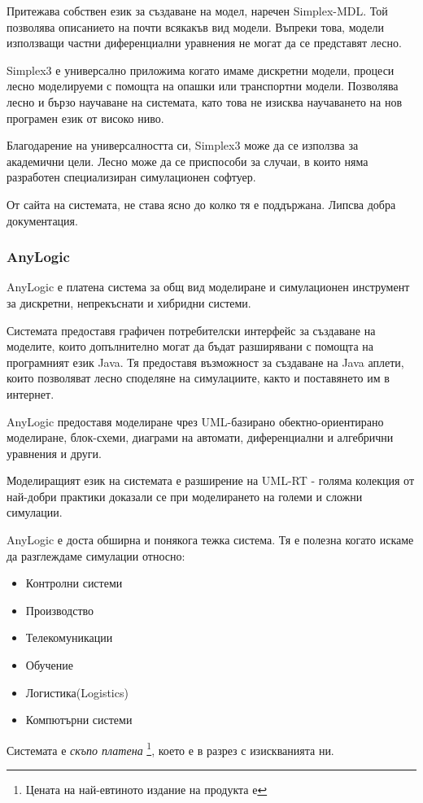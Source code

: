 			Притежава собствен език за създаване на модел, наречен Simplex-MDL. 
			Той позволява описанието на почти всякакъв вид модели. Въпреки това,
			модели използващи частни диференциални уравнения не могат да се представят
			лесно.
			
			Simplex3 е универсално приложима когато имаме дискретни модели, процеси
			лесно моделируеми с помощта на опашки или транспортни модели. 
			Позволява лесно и бързо научаване на системата, като това не изисква
			научаването на нов програмен език от високо ниво.
			
			Благодарение на универсалността си, Simplex3 може да се използва за академични цели.
			Лесно може да се приспособи за случаи, в които няма разработен специализиран симулационен
			софтуер. 
			
			От сайта на системата, не става ясно до колко тя е поддържана. 
			Липсва добра документация.\cite{Simplex3}
		
		\subsubsection{AnyLogic}
			AnyLogic е платена система за общ вид моделиране и симулационен инструмент за 
			дискретни, непрекъснати и хибридни системи.
			
			Системата предоставя графичен потребителски интерфейс за създаване на моделите, 
			които допълнително могат да бъдат разширявани с помощта на програмният език Java. 
			Тя предоставя възможност за създаване на Java аплети, 
			които позволяват лесно споделяне на симулациите, както и поставянето им в интернет.
			
			AnyLogic предоставя моделиране чрез UML-базирано обектно-ориентирано моделиране, блок-схеми, 
			диаграми на автомати, диференциални и алгебрични уравнения и други.
		
			Моделиращият език на системата е разширение на UML-RT - голяма колекция от най-добри практики
			доказали се при моделирането на големи и сложни симулации.
			
			AnyLogic е доста обширна и понякога тежка система. 
			Тя е полезна когато искаме да разглеждаме симулации относно:
			
			\begin{itemize}
			\item Контролни системи
			\item Производство
			\item Телекомуникации
			\item Обучение
			\item Логистика(Logistics)
			\item Компютърни системи
			\end{itemize}
			
			Системата е \emph{скъпо платена} \footnote{Цената на най-евтиното издание на продукта е }, което е в разрез с изискванията ни. \cite{AnyLogic}